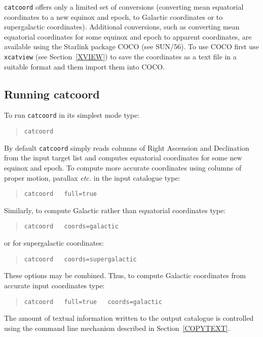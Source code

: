 \documentclass[twoside,11pt]{article}
\newcommand{\xref}[3]{#1}
\renewcommand{\_}{\texttt{\symbol{95}}}
\begin{document}
{\tt catcoord} offers only a limited set of conversions (converting
mean equatorial coordinates to a new equinox and epoch, to Galactic
coordinates or to supergalactic coordinates).  Additional conversions,
such as converting mean equatorial coordinates for some equinox and epoch
to apparent coordinates, are available using the Starlink package COCO (see
\xref{SUN/56}{sun56}{}\cite{SUN56}).  To use COCO first use {\tt xcatview}
(see Section~\ref{XVIEW}) to save the coordinates as a text file in a
suitable format and them import them into COCO.

\subsection{Running catcoord}

To run {\tt catcoord} in its simplest mode type:

\begin{verse}
{\tt catcoord}
\end{verse}

By default {\tt catcoord} simply reads columns of Right Ascension and
Declination from the input target list and computes equatorial
coordinates for some new equinox and epoch.  To compute more accurate
coordinates using columns of proper motion, parallax \emph{etc.} in the
input catalogue type:

\begin{verse}
{\tt catcoord ~ full=true}
\end{verse}

Similarly, to compute Galactic rather than equatorial coordinates type:

\begin{verse}
{\tt catcoord ~ coords=galactic}
\end{verse}

or for supergalactic coordinates:

\begin{verse}
{\tt catcoord ~ coords=supergalactic}
\end{verse}

These options may be combined.  Thus, to compute Galactic coordinates
from accurate input coordinates type:

\begin{verse}
{\tt catcoord ~ full=true ~ coords=galactic}
\end{verse}

The amount of textual information written to the output catalogue is
controlled using the command line mechanism described in
Section~\ref{COPYTEXT}.
\end{document}
